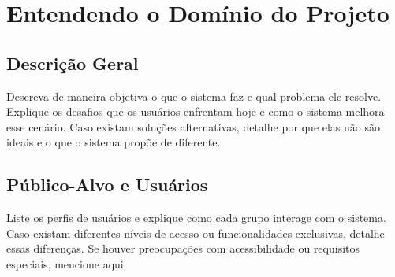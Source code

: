 \section{Entendendo o Domínio do Projeto}


\subsection{Descrição Geral}


Descreva de maneira objetiva o que o sistema faz e qual problema ele resolve.  
Explique os desafios que os usuários enfrentam hoje e como o sistema melhora esse cenário.  
Caso existam soluções alternativas, detalhe por que elas não são ideais e o que o sistema propõe de diferente.  

\subsection{Público-Alvo e Usuários}


Liste os perfis de usuários e explique como cada grupo interage com o sistema.  
Caso existam diferentes níveis de acesso ou funcionalidades exclusivas, detalhe essas diferenças.  
Se houver preocupações com acessibilidade ou requisitos especiais, mencione aqui.  

